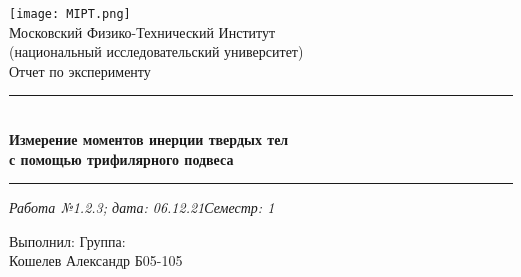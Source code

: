 \documentclass[12pt,a4paper]{scrartcl}
\begin{document}
	\graphicspath{{C:/Users/Alex/OneDrive/Изображения/TexImgs}}
	
	\newcommand{\ms}{\mathstrut}
	\newcommand{\msp}{\hspace{0.5cm}}
	\newcommand{\al}{\alpha}
	\newcommand{\dg}{^\circ}
	\newcommand{\qd}[2]{^{\frac{#1}{#2}}}
	\newcommand{\qdm}[2]{^{-\frac{#1}{#2}}}
	\newcommand{\lm}[2]{\underset{#1 \rightarrow #2}{\lim}}
	\newcommand{\sfrac}[2]{\dfrac{\strut #1}{\strut #2}}
	\newcommand{\equal}[1]{\overset{(#1)}{=}}
	\newcommand{\linevdots}{\ \raisebox{-.08\height}{\vdots}\ }
	\newcommand{\linecvdots}{\ \raisebox{-.08\height}{\vdots}\hspace{-0.13cm}\raisebox{.15\height}{\cancel{\phantom{a}}\hspace{0.06cm}}}
	\newcommand{\combox}[1]{\ms \msp \msp \begin{minipage}{0.95\linewidth}
			#1
	\end{minipage}}
	
	\newtheorem{pr}{Задача}
	\newtheorem{ex}{Пример}
	\newtheorem{dfn}{Def}
	\newtheorem{theorem}{Th}
	\newtheorem{st}{St}
	
	\newenvironment{slv}{\ms \msp \textit{Решение:}}{}
	\newenvironment{proof}{\ms \msp \textit{Доказательство: }}{\hfill $\square$}
	
	\begin{titlepage}
		
		\vspace*{\fill}
		
		\begin{center}
			\texttt{[image: MIPT.png]}
			\\[0.7cm]\Huge Московский Физико-Технический Институт\\(национальный исследовательский университет)
			\\[2cm]\LARGE Отчет по эксперименту
			\\[0.5cm]\noindent\rule{\textwidth}{1pt}
			\\\Huge\textbf{Измерение моментов инерции твердых тел\\с помощью трифилярного подвеса}
			\\[-0.5cm]\noindent\rule{\textwidth}{1pt}
		\end{center}
		
		\begin{flushleft}
			\textit{Работа №1.2.3; дата: 06.12.21}\hfill\textit{Семестр: 1}
		\end{flushleft}
		
		\vspace*{\fill}
		
		\begin{flushleft}
			Выполнил: \hspace{\fill} Группа:
			\\Кошелев Александр \hspace{\fill} Б05-105
		\end{flushleft}
	\end{titlepage}
	
\end{document}
